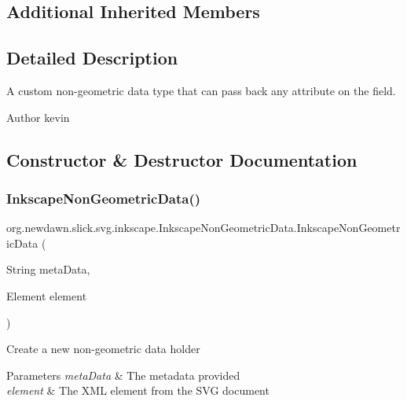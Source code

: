 \subsection*{Additional Inherited Members}


\subsection{Detailed Description}
A custom non-\/geometric data type that can pass back any attribute on the field.

\begin{DoxyAuthor}{Author}
kevin 
\end{DoxyAuthor}


\subsection{Constructor \& Destructor Documentation}
\mbox{\label{classorg_1_1newdawn_1_1slick_1_1svg_1_1inkscape_1_1_inkscape_non_geometric_data_ae23ad1b912f1dd79ec8b3f85b7b72f6d}} 
\subsubsection{\texorpdfstring{Inkscape\+Non\+Geometric\+Data()}{InkscapeNonGeometricData()}}
{\footnotesize\ttfamily org.\+newdawn.\+slick.\+svg.\+inkscape.\+Inkscape\+Non\+Geometric\+Data.\+Inkscape\+Non\+Geometric\+Data (\begin{DoxyParamCaption}\item[{String}]{meta\+Data,  }\item[{Element}]{element }\end{DoxyParamCaption})\hspace{0.3cm}{\ttfamily [inline]}}

Create a new non-\/geometric data holder


\begin{DoxyParams}{Parameters}
{\em meta\+Data} & The metadata provided \\
\hline
{\em element} & The X\+ML element from the S\+VG document \\
\hline
\end{DoxyParams}


